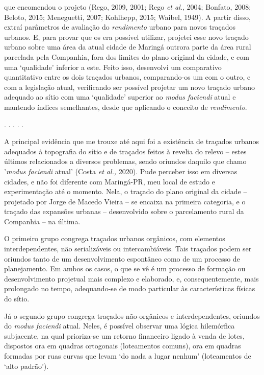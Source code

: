 \documentclass[]{report}
\begin{document}
	que encomendou o projeto (Rego, 2009, 2001; Rego \textit{et al.}, 2004; Bonfato, 2008; Beloto, 2015; Meneguetti, 2007; Kohlhepp, 2015; Waibel, 1949). A partir disso, extraí parâmetros de avaliação do \textit{rendimento} urbano para novos traçados urbanos. E, para provar que os era possível utilizar, projetei esse novo traçado urbano sobre uma área da atual cidade de Maringá outrora parte da área rural parcelada pela Companhia, fora dos limites do plano original da cidade, e com uma `qualidade' inferior a este. Feito isso, desenvolvi um comparativo quantitativo entre os dois traçados urbanos, comparando-os um com o outro, e com a legislação atual, verificando ser possível projetar um novo traçado urbano adequado ao sítio com uma `qualidade' superior ao \textit{modus faciendi} atual e mantendo índices semelhantes, desde que aplicando o conceito de \textit{rendimento}.

	\begin{center}
		. . . . .
	\end{center}

	A principal evidência que me trouxe até aqui foi a existência de traçados urbanos adequados à topografia do sítio e de traçados feitos à revelia do relevo – estes últimos relacionados a diversos problemas, sendo oriundos daquilo que chamo '\textit{modus faciendi} atual' (Costa \textit{et al.,} 2020). Pude perceber isso em diversas cidades, e não foi diferente com Maringá-PR, meu local de estudo e experimentação até o momento. Nela, o traçado do plano original da cidade – projetado por Jorge de Macedo Vieira – se encaixa na primeira categoria, e o traçado das expansões urbanas – desenvolvido sobre o parcelamento rural da Companhia – na última. 

	O primeiro grupo congrega traçados urbanos orgânicos, com elementos interdependentes, não serializáveis ou intercambiáveis. Tais traçados podem ser oriundos tanto de um desenvolvimento espontâneo como de um processo de planejamento. Em ambos os casos, o que se vê é um processo de formação ou desenvolvimento projetual mais complexo e elaborado, e, consequentemente, mais prolongado no tempo, adequando-se de modo particular às características físicas do sítio. 

	Já o segundo grupo congrega traçados não-orgânicos e interdependentes, oriundos do \textit{modus faciendi} atual. Neles, é possível observar uma lógica hilemórfica subjacente, na qual prioriza-se um retorno financeiro ligado à venda de lotes, dispostos ora em quadras ortogonais (loteamentos comuns), ora em quadras formadas por ruas curvas que levam `do nada a lugar nenhum' (loteamentos de `alto padrão'). %
\end{document}

